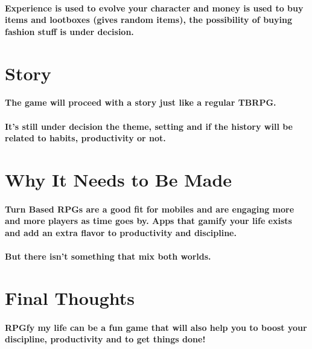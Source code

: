 \documentclass[12pt, twocolumn]{article}
\begin{document}
\paragraph{Experience is used to evolve your character and money is used to buy items and lootboxes (gives random items), the possibility of buying fashion stuff is under decision.}

\section*{Story}

\paragraph{The game will proceed with a story just like a regular TBRPG.}

\paragraph{It's still under decision the theme, setting and if the history will be related to habits, productivity or not.}

\section*{Why It Needs to Be Made}

\paragraph{Turn Based RPGs are a good fit for mobiles and are engaging more and more players as time goes by. Apps that gamify your life exists and add an extra flavor to productivity and discipline.}

\paragraph{But there isn't something that mix both worlds.}

\section*{Final Thoughts}

\paragraph{RPGfy my life can be a fun game that will also help you to boost your discipline, productivity and to get things done!}
\end{document}
